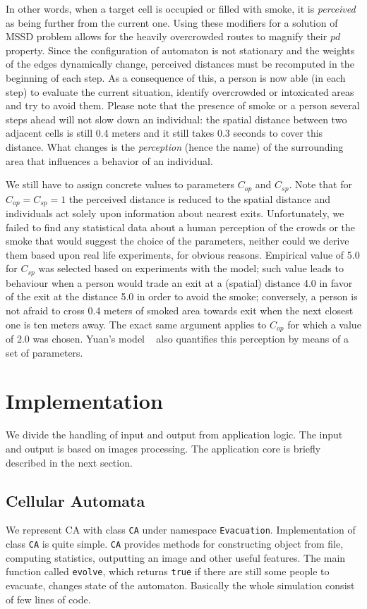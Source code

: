 In other words, when a target cell is occupied or filled with smoke, it is \emph{
perceived} as being further from the current one.
Using these modifiers for a solution of MSSD problem allows for the heavily 
overcrowded routes to magnify their $pd$ property.
Since the configuration of automaton is not stationary and the weights of the edges 
dynamically change, perceived distances must be recomputed in the beginning of each 
step.
As a consequence of this, a person is now able (in each step) to evaluate the 
current situation, identify overcrowded or intoxicated areas and try to avoid them. 
Please note that the presence of smoke or a person several steps ahead will not slow 
down an individual: the spatial distance between two adjacent cells is still 0.4 
meters and it still takes 0.3 seconds to cover this distance.
What changes is the \emph{perception} (hence the name) of the surrounding area that
influences a behavior of an individual.

We still have to assign concrete values to parameters $C_{op}$ and $C_{sp}$.
Note that for $C_{op} = C_{sp} = 1$ the perceived distance is reduced to the spatial 
distance and individuals act solely upon information about nearest exits. 
Unfortunately, we failed to find any statistical data about a human perception of 
the crowds or the smoke that would suggest the choice of the parameters, neither 
could we derive them based upon real life experiments, for obvious reasons. 
Empirical value of 5.0 for $C_{sp}$ was selected based on experiments with the 
model; such value leads to behaviour when a person would trade an exit at a
(spatial) distance 4.0 in favor of the exit at the distance 5.0 in order to avoid 
the smoke; conversely, a person is not afraid to cross 0.4 meters of smoked area 
towards exit when the next closest one is ten meters away.
The exact same argument applies to $C_{op}$ for which a value of 2.0 was chosen.
Yuan's model ~\cite{Yuan} also quantifies this perception by means of a set
of parameters.

\section{Implementation}
We divide the handling of input and output from application logic. The
input and output is based on images processing. The application core is briefly
described in the next section.

\subsection{Cellular Automata}
We represent CA with class \texttt{CA} under namespace \texttt{Evacuation}.
Implementation of class \texttt{CA} is quite simple. \texttt{CA} provides
methods for constructing object from file, computing statistics, outputting an
image and other useful features. The main function called \texttt{evolve},
which returns \texttt{true} if there are still some people to evacuate, changes
state of the automaton. Basically the whole simulation consist of few lines of
code.

